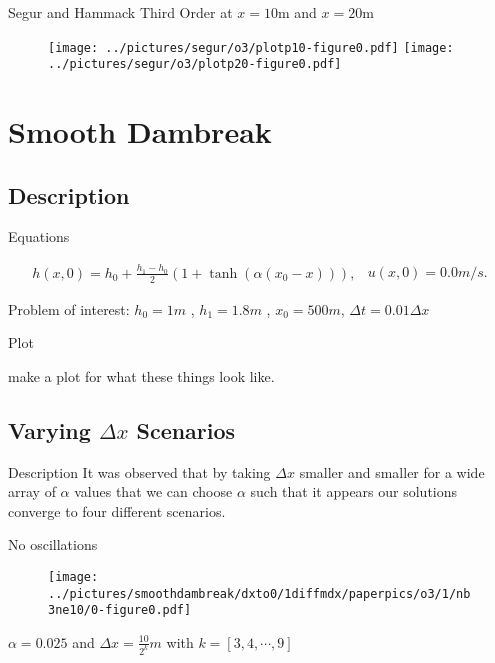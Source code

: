 \documentclass[pdf]{beamer}
\begin{document}
\begin{frame}{Segur and Hammack}
Third Order at $x = 10\text{m}$ and $x = 20 \text{m}$
\begin{figure}
\texttt{[image: ../pictures/segur/o3/plotp10-figure0.pdf]}
\texttt{[image: ../pictures/segur/o3/plotp20-figure0.pdf]}
\end{figure}
\end{frame}

\section{Smooth Dambreak}
\subsection{Description}

\begin{frame}{Equations}

\begin{subequations}
\begin{gather}
h(x,0) = h_0 + \frac{h_1 - h_0}{2}\left(1 + \tanh\left(\alpha\left(x_0 - x\right)\right)\right),
\end{gather}
\begin{gather}
u(x,0) = 0.0m/s.
\end{gather}
\end{subequations}
\label{eq:sdbi}

Problem of interest:
$h_0 = 1m$ , $h_1 = 1.8m$ , $x_0 = 500m$, $\Delta t = 0.01 \Delta x$
\end{frame}

\begin{frame}{Plot}

make a plot for what these things look like.

\end{frame}

\subsection{Varying $\Delta x$ Scenarios}

\begin{frame}{Description}
It was observed that by taking $\Delta x$ smaller and smaller for a wide array of $\alpha$ values that we can choose $\alpha$ such that it appears our solutions converge to four different scenarios.
\end{frame}

\begin{frame}{No oscillations}
\begin{figure}
\texttt{[image: ../pictures/smoothdambreak/dxto0/1diffmdx/paperpics/o3/1/nb3ne10/0-figure0.pdf]}
\end{figure}
$\alpha = 0.025$ and $\Delta x = \frac{10}{2^k} m$ with $k = [3,4,\cdots,9]$
\end{frame}
\end{document}
